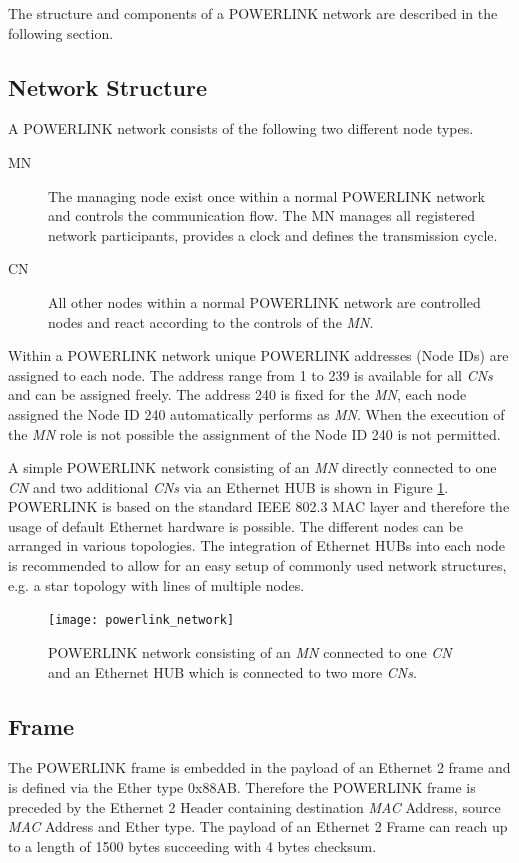 The structure and components of a POWERLINK network are described in the following section.

\subsection{Network Structure}
\label{sec:oplk_powerlink_network}
A POWERLINK network consists of the following two different node types.

\begin{description}
    \item[MN] The managing node exist once within a normal POWERLINK network and controls the communication flow.
    The MN manages all registered network participants, provides a clock and defines the transmission cycle.
    \item[CN] All other nodes within a normal POWERLINK network are controlled nodes and react according to the controls of the \emph{MN}.
\end{description}

Within a POWERLINK network unique POWERLINK addresses (Node IDs) are assigned to each node.
The address range from 1 to 239 is available for all \emph{CNs} and can be assigned freely.
The address 240 is fixed for the \emph{MN}, each node assigned the Node ID 240 automatically performs as \emph{MN}.
When the execution of the \emph{MN} role is not possible the assignment of the Node ID 240 is not permitted.
\cite{epsg_epsg_2013}

A simple POWERLINK network consisting of an \emph{MN} directly connected to one \emph{CN} and two additional \emph{CNs} via an Ethernet HUB is shown in Figure \ref{fig:powerlink_network}.
POWERLINK is based on the standard IEEE 802.3 MAC layer and therefore the usage of default Ethernet hardware is possible.
The different nodes can be arranged in various topologies.
The integration of Ethernet HUBs into each node is recommended to allow for an easy setup of commonly used network structures, e.g. a star topology with lines of multiple nodes. \cite[chapter 3]{epsg_epsg_2013}

\begin{figure}
    \centering
    \texttt{[image: powerlink\_network]}
    \caption{POWERLINK network consisting of an \emph{MN} connected to one \emph{CN} and an Ethernet HUB which is connected to two more \emph{CNs}.}
    \label{fig:powerlink_network}
\end{figure}

\subsection{Frame}
\label{sec:oplk_powerlink_frame}
The POWERLINK frame is embedded in the payload of an Ethernet 2 frame and is defined via the Ether type 0x88AB.
Therefore the POWERLINK frame is preceded by the Ethernet 2 Header containing destination \emph{MAC} Address, source \emph{MAC} Address and Ether type.
The payload of an Ethernet 2 Frame can reach up to a length of 1500 bytes succeeding with 4 bytes checksum. \cite[section 3.2]{ethernet_ieee_2016} \cite[section 4.6.1]{epsg_epsg_2013}


